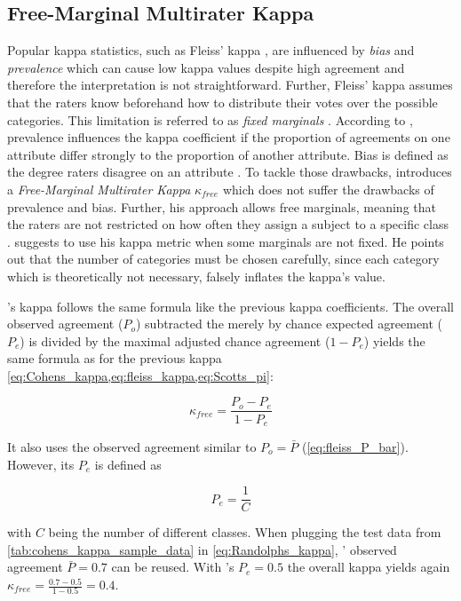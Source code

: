 \subsection{Free-Marginal Multirater Kappa}
\label{chp:fundamentals:sec:inter_rater_agreement:subsec:free_marginal_multirater_kappa}

Popular kappa statistics, such as Fleiss' kappa \parencite{Fleiss:1971}, are influenced by \textit{bias} and \textit{prevalence} which can cause low kappa values despite high agreement \parencite{Randolph:2005, Sim:2005} and therefore the interpretation is not straightforward.
Further, Fleiss' kappa assumes that the raters know beforehand how to distribute their votes over the possible categories.
This limitation is referred to as \textit{fixed marginals} \parencite{Brennan:1981}.
According to \textcite{Sim:2005}, prevalence influences the kappa coefficient if the proportion of agreements on one attribute differ strongly to the proportion of another attribute.
Bias is defined as the degree raters disagree on an attribute \parencite{Sim:2005}.
To tackle those drawbacks, \textcite{Randolph:2005} introduces a \textit{Free-Marginal Multirater Kappa} $\kappa_{free}$ which does not suffer the drawbacks of prevalence and bias.
Further, his approach allows free marginals, meaning that the raters are not restricted on how often they assign a subject to a specific class \parencite{Brennan:1981}.
\textcite{Randolph:2005} suggests to use his kappa metric when some marginals are not fixed.
He points out that the number of categories must be chosen carefully, since each category which is theoretically not necessary, falsely inflates the kappa's value.

's kappa \parencite{Randolph:2005} follows the same formula like the previous kappa coefficients.
The overall observed agreement ($P_o$) subtracted the merely by chance expected agreement ($P_e$) is divided by the maximal adjusted chance agreement ($1-P_e$) yields the same formula as for the previous kappa \cref{eq:Cohens_kappa,eq:fleiss_kappa,eq:Scotts_pi}:

\begin{equation}\label{eq:Randolphs_kappa}
    \kappa_{free} = \frac{P_o - P_e}{1 - P_e}
\end{equation}

It also uses the observed agreement similar to \citeauthor{Fleiss:1971}  $P_o=\bar{P}$ (\cref{eq:fleiss_P_bar}).
However, its $P_e$ is defined as

\begin{equation}\label{eq:Randolphs_Pe}
P_e = \frac{1}{C}
\end{equation}

with $C$ being the number of different classes.
When plugging the test data from \cref{tab:cohens_kappa_sample_data} in \cref{eq:Randolphs_kappa}, \citeauthor{Fleiss:1971}' observed agreement $\bar{P} = 0.7$ can be reused.
With \citeauthor{Randolph:2005}'s $P_e = 0.5$ the overall kappa yields again $\kappa_{free} = \frac{0.7 - 0.5}{1 - 0.5} = 0.4$.
